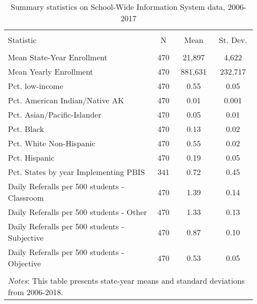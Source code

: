 
\begin{table}[!htbp] \centering 
  \caption{Summary statistics on School-Wide Information System data, 2006-2017} 
  \label{tab:descriptives} 
\begin{tabular}{@{\extracolsep{5pt}}lccc} 
\\[-1.8ex]\hline 
\hline \\[-1.8ex] 
Statistic & \multicolumn{1}{c}{N} & \multicolumn{1}{c}{Mean} & \multicolumn{1}{c}{St. Dev.} \\ 
\hline \\[-1.8ex] 
Mean State-Year Enrollment & 470 & 21,897 & 4,622 \\ 
Mean Yearly Enrollment & 470 & 881,631 & 232,717 \\ 
Pct. low-income & 470 & 0.55 & 0.05 \\ 
Pct. American Indian/Native AK & 470 & 0.01 & 0.001 \\ 
Pct. Asian/Pacific-Islander & 470 & 0.05 & 0.01 \\ 
Pct. Black & 470 & 0.13 & 0.02 \\ 
Pct. White Non-Hispanic & 470 & 0.55 & 0.02 \\ 
Pct. Hispanic & 470 & 0.19 & 0.05 \\ 
Pct. States by year Implementing PBIS & 341 & 0.72 & 0.45 \\ 
Daily Referalls per 500 students - Classroom & 470 & 1.39 & 0.14 \\ 
Daily Referalls per 500 students - Other & 470 & 1.33 & 0.13 \\ 
Daily Referalls per 500 students - Subjective & 470 & 0.87 & 0.10 \\ 
Daily Referalls per 500 students - Objective & 470 & 0.53 & 0.05 \\ 
\hline \\[-1.8ex] 
\multicolumn{4}{l}{\textit{Notes}: This table presents state-year means and standard deviations from 2006-2018.} \\ 
\end{tabular} 
\end{table} 

